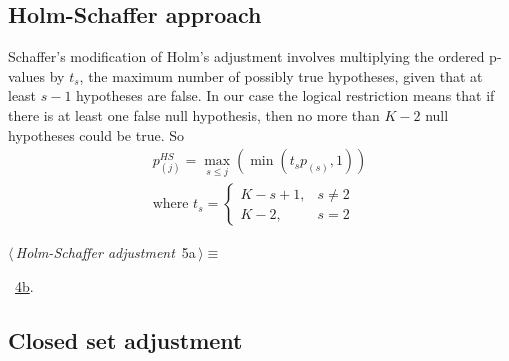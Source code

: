 \documentclass[reqno]{amsart}
\renewcommand{\NWtarget}[2]{\hypertarget{#1}{#2}}
\renewcommand{\NWlink}[2]{\hyperlink{#1}{#2}}
\begin{document}
\subsection{Holm-Schaffer approach}
Schaffer's modification of Holm's adjustment involves multiplying the ordered p-values by $t_s$, the maximum number of possibly true hypotheses, given that at least $s - 1$ hypotheses are false. In our case the logical restriction means that if there is at least one false null hypothesis, then no more than $K-2$ null hypotheses could be true. So
\begin{gather*}
p^{HS}_{(j)} = \max_{s\leq j}(\min( t_s p_{(s)}, 1))\\
\text{where } t_s = \begin{cases}
                   K-s+1, & s\neq 2\\
                   K - 2, & s=2
                  \end{cases}
\end{gather*}


\begin{flushleft} \small\label{scrap6}\raggedright\small
\NWtarget{nuweb5a}{} $\langle\,${\itshape Holm-Schaffer adjustment}\nobreak\ {\footnotesize {5a}}$\,\rangle\equiv$
\vspace{-1ex}
\vspace{-1.5ex}
\footnotesize
\begin{list}{}{\setlength{\itemsep}{-\parsep}\setlength{\itemindent}{-\leftmargin}}
\item \NWtxtMacroRefIn\ \NWlink{nuweb4b}{4b}.

\item{}
\end{list}
\vspace{4ex}
\end{flushleft}
\subsection{Closed set adjustment}
\end{document}

